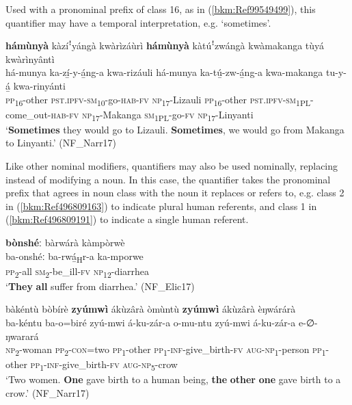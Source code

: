 Used with a pronominal prefix of class 16, as in (\ref{bkm:Ref99549499}), this quantifier may have a temporal interpretation, e.g. ‘sometimes’.

\ea
\label{bkm:Ref99549499}
\textbf{hámùnyà} kàzíꜝyángà kwàrìzáùrì \textbf{hámùnyà} kàtúꜝzwángà kwàmakanga tùyá kwàrìnyântì\\
\gll há-munya  ka-zí̲-y-á̲ng-a    kwa-rizáuli há-munya  ka-tú̲-zw-á̲ng-a        kwa-makanga tu-y-á̲  kwa-rinyánti\\
\textsc{pp}\textsubscript{16}-other  \textsc{pst}.\textsc{ipfv}-\textsc{sm}\textsubscript{10}-go-\textsc{hab}-\textsc{fv}  \textsc{np}\textsubscript{17}-Lizauli \textsc{pp}\textsubscript{16}-other  \textsc{pst}.\textsc{ipfv}-\textsc{sm}\textsubscript{1PL}-come\_out-\textsc{hab}-\textsc{fv}  \textsc{np}\textsubscript{17}-Makanga \textsc{sm}\textsubscript{1PL}-go-\textsc{fv}  \textsc{np}\textsubscript{17}-Linyanti\\
\glt ‘\textbf{Sometimes} they would go to Lizauli. \textbf{Sometimes}, we would go from Makanga to Linyanti.’ (NF\_Narr17)
\z

Like other nominal modifiers, quantifiers may also be used nominally, replacing instead of modifying a noun. In this case, the quantifier takes the pronominal prefix that agrees in noun class with the noun it replaces or refers to, e.g. class 2 in (\ref{bkm:Ref496809163}) to indicate plural human referents, and class 1 in (\ref{bkm:Ref496809191}) to indicate a single human referent.

\ea
\label{bkm:Ref496809163}
\textbf{bònshéː} bàrwárà kàmpòrwè\\
\gll ba-onshéː  ba-rwá̲\textsubscript{H}r-a  ka-mporwe\\
\textsc{pp}\textsubscript{2}-all    \textsc{sm}\textsubscript{2}-be\_ill-\textsc{fv}  \textsc{np}\textsubscript{12}-diarrhea\\
\glt ‘\textbf{They} \textbf{all} suffer from diarrhea.’ (NF\_Elic17)
\z

\ea
\label{bkm:Ref496809191}
bàkéntù bòbírè \textbf{zyúmwì} ákùzârà òmùntù \textbf{zyúmwì} ákùzârà èŋwárárà\\
\gll ba-kéntu  ba-o=biré  zyú-mwi  á-ku-zár-a o-mu-ntu     zyú-mwi  á-ku-zár-a      e-∅-ŋwarará\\
\textsc{np}\textsubscript{2}-woman  \textsc{pp}\textsubscript{2}-\textsc{con}=two  \textsc{pp}\textsubscript{1}-other  \textsc{pp}\textsubscript{1}-\textsc{inf}-give\_birth-\textsc{fv} \textsc{aug}-\textsc{np}\textsubscript{1}-person   \textsc{pp}\textsubscript{1}-other  \textsc{pp}\textsubscript{1}-\textsc{inf}-give\_birth-\textsc{fv}  \textsc{aug}-\textsc{np}\textsubscript{5}-crow\\
\glt ‘Two women. \textbf{One} gave birth to a human being, \textbf{the} \textbf{other} \textbf{one} gave birth to a crow.’ (NF\_Narr17)
\z
